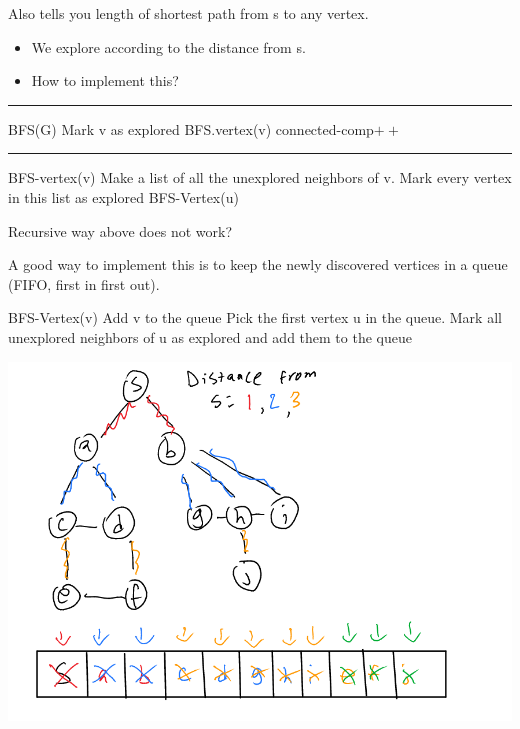 \documentclass[11pt]{article}
\begin{document}
Also tells you length of shortest path from s to any vertex.
\begin{itemize}
\item We explore according to the distance from s.
\item How to implement this?
\end{itemize}

\noindent\rule{\textwidth}{0.5pt}
\begin{algorithmic}
  \State BFS(G)
  \State Mark v as explored
  \State BFS.vertex(v)
  \State connected-comp$++$
  \EndIf
  \EndFor
\end{algorithmic}

\noindent\rule{\textwidth}{0.5pt}
\begin{algorithmic}
  \State BFS-vertex(v)
  \State Make a list of all the unexplored neighbors of v.
  \State Mark every vertex in this list as explored
  \State BFS-Vertex(u)
  \EndFor
\end{algorithmic}
Recursive way above does not work?

A good way to implement this is to keep the newly discovered vertices in a queue (FIFO, first in first out).
\begin{algorithmic}
  \State BFS-Vertex(v)
  \State Add v to the queue
        \State Pick the first vertex u in the queue.
        \State Mark all unexplored neighbors of u as explored and add
        them to the queue
  \EndWhile
\end{algorithmic}
\begin{center}
\includegraphics[width=.9\linewidth]{./Images/i17.png}
\end{center}
\end{document}

